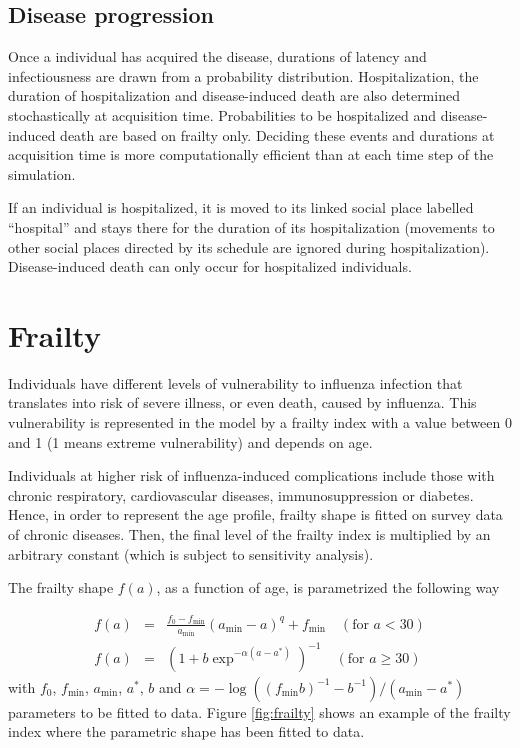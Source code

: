 \documentclass[11pt, onecolumn]{article}
\begin{document}
\subsection{Disease progression}

Once a individual has acquired the disease, durations of latency and infectiousness are drawn from a probability distribution. Hospitalization, the duration of hospitalization and disease-induced death are also determined stochastically at acquisition time.
Probabilities to be hospitalized and disease-induced death are based on frailty only.
Deciding these events and durations at acquisition time is more computationally efficient than at each time step of the simulation.

If an individual is hospitalized, it is moved to its linked social place labelled ``hospital'' and stays there for the duration of its hospitalization (movements to other social places directed by its schedule are ignored during hospitalization). Disease-induced death can only occur for hospitalized individuals.


\section{Frailty}

Individuals have different levels of vulnerability to influenza infection that translates into risk of severe illness, or even death, caused by influenza. This vulnerability is represented in the model by a frailty index with a value between 0 and 1 (1 means extreme vulnerability) and depends on age. 

Individuals at higher risk of influenza-induced complications include those with chronic respiratory, cardiovascular diseases, immunosuppression or diabetes. Hence, in order to represent the age profile, frailty shape is fitted on survey data of chronic diseases. Then, the final level of the frailty index is multiplied by an arbitrary constant (which is subject to sensitivity analysis). 

The frailty shape $f(a)$, as a function of age, is parametrized the following way

\begin{eqnarray}
f(a) & = & \frac{ f_0 - f_{\min} }{a_{\min} } (a_{\min} - a)^q + f_{\min}   \,\,\,\,\,\,(\text{for } a<30)  \\
f(a) & = & \left(1+b\exp^{-\alpha(a-a^*)} \right)^{-1}  \,\,\,\,\,\, (\text{for } a\geq30)
\end{eqnarray}
with $f_0$, $f_{\min}$, $a_{\min}$, $a^*$, $b$ and $\alpha=-\log((f_{\min}b)^{-1}-b^{-1})/(a_{\min}-a^*)$ parameters to be fitted to data. 
Figure \ref{fig:frailty} shows an example of the frailty index where the parametric shape has been fitted to data.
\end{document}
